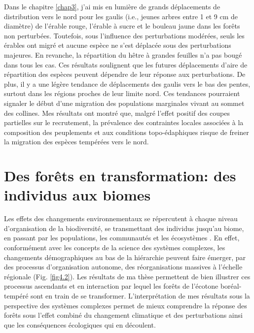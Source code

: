 Dans le chapitre \ref{chap3}, j'ai mis en lumière de grands déplacements
de distribution vers le nord pour les gaulis (i.e., jeunes arbres entre
1 et 9 cm de diamètre) de l'érable rouge, l'érable à sucre et le bouleau
jaune dans les forêts non perturbées. Toutefois, sous l'influence des
perturbations modérées, seuls les érables ont migré et aucune espèce ne
s'est déplacée sous des perturbations majeures. En revanche, la
répartition du hêtre à grandes feuilles n'a pas bougé dans tous les cas.
Ces résultats soulignent que les futures déplacements d'aire de
répartition des espèces peuvent dépendre de leur réponse aux
perturbations. De plus, il y a une légère tendance de déplacements des
gaulis vers le bas des pentes, surtout dans les régions proches de leur
limite nord. Ces tendances pourraient signaler le début d'une migration
des populations marginales vivant au sommet des collines. Mes résultats
ont montré que, malgré l'effet positif des coupes partielles sur le
recrutement, la prévalence des contraintes locales associées à la
composition des peuplements et aux conditions topo-édaphiques risque de
freiner la migration des espèces tempérées vers le nord.

\hypertarget{des-foruxeats-en-transformation-des-individus-aux-biomes}{%
\section{Des forêts en transformation: des individus aux
biomes}\label{des-foruxeats-en-transformation-des-individus-aux-biomes}}

Les effets des changements environnementaux se répercutent à chaque
niveau d'organisation de la biodiversité, se transmettant des individus
jusqu'au biome, en passant par les populations, les communautés et les
écosystèmes \citep{bellard_impacts_2012, parmesan_globally_2003}. En
effet, conformément avec les concepts de la science des systèmes
complexes, les changements démographiques au bas de la hiérarchie
peuvent faire émerger, par des processus d'organisation autonome, des
réorganisations massives à l'échelle régionale (Fig. \ref{fig4.2}). Les
résultats de ma thèse permettent de bien illustrer ces processus
ascendants et en interaction par lequel les forêts de l'écotone
boréal-tempéré sont en train de se transformer. L'interprétation de mes
résultats sous la perspective des systèmes complexes permet de mieux
comprendre la réponse des forêts sous l'effet combiné du changement
climatique et des perturbations ainsi que les conséquences écologiques
qui en découlent.

